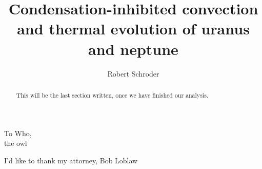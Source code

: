 \documentclass[11pt]{ucscthesisbs}
\begin{document}

\title{Condensation-inhibited convection and thermal evolution of uranus and neptune}
\author{Robert Schroder}
%
%





\maketitle
\copyrightpage

\begin{frontmatter}

\begin{abstract}
This will be the last section written, once we have finished our analysis.
\end{abstract}

\tableofcontents
%
%
\listoffigures
\listoftables

\begin{dedication}
\null\vfil
{\large
\begin{center}
To Who,\\\vspace{12pt}
the owl
\end{center}}
\vfil\null
\end{dedication}

\begin{acknowledgements}
I'd like to thank my attorney, Bob Loblaw
\end{acknowledgements}


\end{frontmatter}

\end{document}
